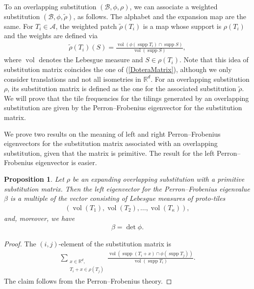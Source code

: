 \documentclass[a4]{amsart}
\DeclareMathOperator{\supp}{supp}
\DeclareMathOperator{\vol}{vol}
\newcommand{\T}{{\mathcal T}}
\newtheorem{prop}[theorem]{Proposition}
\theoremstyle{definition}
\begin{document}
To an overlapping substitution $(\mathcal{B},\phi,\rho)$, we can associate a weighted substitution
$(\mathcal{B},\phi,\tilde{\rho})$, as follows.
The alphabet and the expansion map are the same. For $T_i\in\mathcal{A}$, the weighted patch $\tilde{\rho}(T_i)$
is a map whose support is $\rho(T_i)$ and the weights are defined via
\begin{align*}
       \tilde{\rho}(T_i)(S)=\frac{\vol(\phi(\supp T_i)\cap\supp S)}{\vol (\supp S)},
\end{align*}
where $\vol$ denotes the Lebesgue measure and $S\in\rho(T_i)$.
{\color{red}Note that this idea of substitution matrix coincides the one of (\ref{DoteraMatrix})}, although we only consider translations and not all isometries in $\mathbb{R}^d$. For an overlapping substitution $\rho$, its
substitution matrix is defined as the one for the associated substitution $\tilde{\rho}$.
We will prove that the tile frequencies for the tilings generated by an overlapping substitution are given by the
Perron--Frobenius eigenvector for the substitution matrix.




We prove two results on the meaning
of left and right Perron--Frobenius
eigenvectors for the substitution matrix associated with an overlapping substitution, given that the matrix is primitive. The result for the left Perron--Frobenius eigenvector is easier.

\begin{prop}\label{prop_left_eigenvector}
    Let $\rho$ be an expanding overlapping substitution with a primitive substitution matrix. Then the left eigenvector for the Perron--Frobenius eigenvalue $\beta$ is a multiple of the vector consisting of Lebesgue measures of proto-tiles
    \begin{align*}
        (\vol(T_1),\vol(T_2),\ldots ,\vol(T_{\kappa})),
    \end{align*}
    and, moreover, we have
    \begin{align*}
        \beta=\det\phi.
    \end{align*}
\end{prop}
\begin{proof}
    The $(i,j)$-element of the substitution matrix is
    \begin{align*}
        \sum_{\substack{x\in\mathbb{R}^d,\\T_i+x\in\rho(T_j)}}\frac{\vol(\supp(T_i+x)\cap\phi(\supp T_j))}{\vol(\supp T_i)}.
    \end{align*}
    The claim follows from the Perron--Frobenius theory.
\end{proof}
\end{document}
